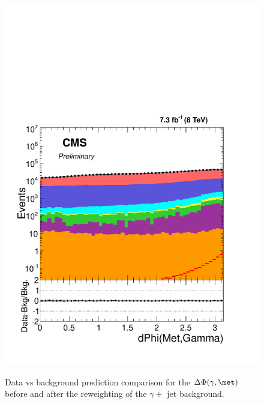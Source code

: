 \begin{figure}[!hp]
{\label{fig:pg_rw_phi_a}\includegraphics[scale=0.4]{analysis_figs/dphi_reweight.pdf}}
\caption{ Data vs background prediction comparison for the $\Delta \Phi (\gamma, \met)$ before and after the reweighting of the  $\gamma + $ jet background.}
\label{fig:pg_rw}
\end{figure}

